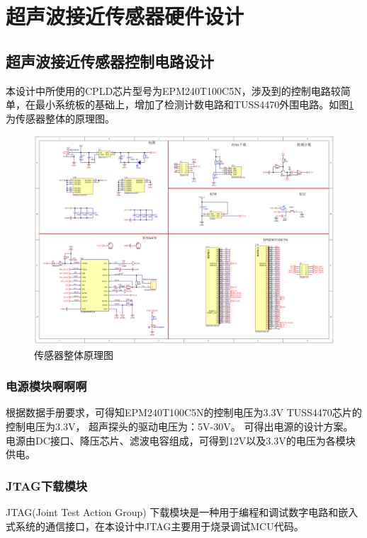 \newpage
\section{超声波接近传感器硬件设计}

\subsection{超声波接近传感器控制电路设计}
本设计中所使用的CPLD芯片型号为EPM240T100C5N，涉及到的控制电路较简单，在最小系统板的基础上，增加了检测计数电路和TUSS4470外围电路。如图\ref{传感器整体原理图}为传感器整体的原理图。
\begin{figure}[ht]
	\centering
	\includegraphics[width=12cm]{figure/Overall circuit.png}
	\caption{传感器整体原理图}
	\label{传感器整体原理图}
\end{figure}
\subsubsection{电源模块啊啊啊}
根据数据手册要求，可得知EPM240T100C5N的控制电压为3.3V
TUSS4470芯片的控制电压为3.3V，
超声探头的驱动电压为：5V-30V。
可得出电源的设计方案。电源由DC接口、降压芯片、滤波电容组成，可得到12V以及3.3V的电压为各模块供电。

\subsubsection{JTAG下载模块}
JTAG(Joint Test Action Group) 下载模块是一种用于编程和调试数字电路和嵌入式系统的通信接口，在本设计中JTAG主要用于烧录调试MCU代码。

